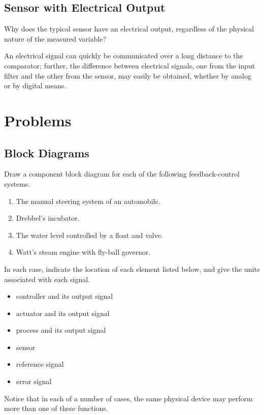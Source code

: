 \subsection{Sensor with Electrical Output}

\begin{prob}
   Why does the typical sensor have an electrical output, regardless of the
   physical nature of the measured variable?
\end{prob}

An electrical signal can quickly be communicated over a long distance to the
comparator; further, the difference between electrical signals, one from the
input filter and the other from the sensor, may easily be obtained, whether by
analog or by digital means.

\section{Problems}

\subsection{Block Diagrams}

\begin{prob}
   Draw a component block diagram for each of the following feedback-control
   systems.
   \begin{enumerate}
      \item The manual steering system of an automobile.
      \item Drebbel's incubator.
      \item The water level controlled by a float and valve.
      \item Watt's steam engine with fly-ball governor.
   \end{enumerate}
   In each case, indicate the location of each element listed below, and give
   the units associated with each signal.
   \begin{itemize}
      \item controller and its output signal
      \item actuator and its output signal
      \item process and its output signal
      \item sensor
      \item reference signal
      \item error signal
   \end{itemize}
   Notice that in each of a number of cases, the same physical device may
   perform more than one of these functions.
\end{prob}

